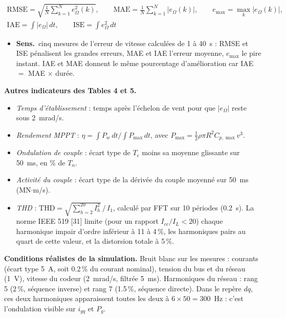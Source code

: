 \documentclass[11pt,a4paper]{article}
\newenvironment{expl}{\begin{itemize}[leftmargin=1.2em,itemsep=2pt,topsep=2pt]}{\end{itemize}}
\newcommand{\sens}{\item \textbf{Sens.}~}
\begin{document}
\begin{equation}\tag{35}
\begin{gathered}
\mathrm{RMSE}=\sqrt{\frac1N\sum_{k=1}^Ne_\Omega^2(k)},\qquad
\mathrm{MAE}=\frac1N\sum_{k=1}^N|e_\Omega(k)|,\qquad
e_{\max}=\max_k|e_\Omega(k)|,\\
\mathrm{IAE}=\int|e_\Omega|\,dt,\qquad
\mathrm{ISE}=\int e_\Omega^2\,dt
\end{gathered}
\end{equation}
\begin{expl}
\sens cinq mesures de l'erreur de vitesse calculées de 1 à 40~s : RMSE et ISE pénalisent les grandes
erreurs, MAE et IAE l'erreur moyenne, $e_{\max}$ le pire instant. IAE et MAE donnent le même pourcentage
d'amélioration car IAE $=$ MAE $\times$ durée.
\end{expl}

\textbf{Autres indicateurs des Tables 4 et 5.}
\begin{itemize}[itemsep=2pt]
\item \emph{Temps d'établissement} : temps après l'échelon de vent pour que $|e_\Omega|$ reste sous 2~mrad/s.
\item \emph{Rendement MPPT} : $\eta=\int P_w\,dt\big/\int P_{\max}\,dt$, avec $P_{\max}=\frac12\rho\pi R^2C_{p,\max}v^3$.
\item \emph{Ondulation de couple} : écart type de $T_e$ moins sa moyenne glissante sur 50~ms, en \% de $T_n$.
\item \emph{Activité du couple} : écart type de la dérivée du couple moyenné sur 50~ms (MN$\cdot$m/s).
\item \emph{THD} : $\mathrm{THD}=\sqrt{\sum_{h=2}^{20}I_h^2}\,/\,I_1$, calculé par FFT sur 10 périodes (0.2~s).
La norme IEEE 519 [31] limite (pour un rapport $I_{cc}/I_L<20$) chaque harmonique impair d'ordre inférieur à 11 à 4\,\%, les harmoniques pairs au quart de cette valeur, et la distorsion totale à 5\,\%.
\end{itemize}

\textbf{Conditions réalistes de la simulation.} Bruit blanc sur les mesures : courants (écart type 5~A,
soit 0.2\,\% du courant nominal), tension du bus et du réseau (1~V), vitesse du codeur (2~mrad/s, filtrée
5~ms). Harmoniques du réseau : rang 5 (2\,\%, séquence inverse) et rang 7 (1.5\,\%, séquence directe). Dans le
repère $dq$, ces deux harmoniques apparaissent toutes les deux à $6\times50=300$~Hz : c'est l'ondulation
visible sur $i_{gq}$ et $P_g$.

\end{document}
